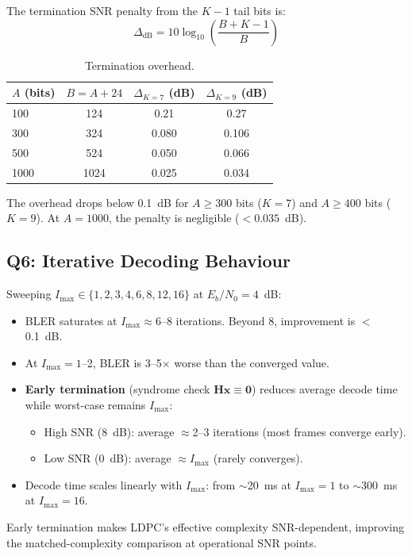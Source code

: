 \documentclass[12pt, a4paper]{article}
\begin{document}
The termination SNR penalty from the $K-1$ tail bits is:
\begin{equation}
\Delta_{\text{dB}} = 10\log_{10}\!\left(\frac{B+K-1}{B}\right)
\end{equation}

\begin{table}[H]\centering
\caption{Termination overhead.}
\begin{tabular}{lccc}
\toprule
$A$ (bits) & $B=A+24$ & $\Delta_{K=7}$ (dB) & $\Delta_{K=9}$ (dB) \\
\midrule
100 & 124 & 0.21 & 0.27 \\
300 & 324 & 0.080 & 0.106 \\
500 & 524 & 0.050 & 0.066 \\
1000 & 1024 & 0.025 & 0.034 \\
\bottomrule
\end{tabular}
\end{table}

The overhead drops below 0.1~dB for $A\geq 300$ bits ($K\!=\!7$) and $A\geq 400$ bits ($K\!=\!9$). At $A=1000$, the penalty is negligible ($<0.035$~dB).

\subsection{Q6: Iterative Decoding Behaviour}
Sweeping $I_{\max}\in\{1,2,3,4,6,8,12,16\}$ at $E_b/N_0=4$~dB:
\begin{itemize}[nosep]
\item BLER saturates at $I_{\max}\approx 6$--8 iterations. Beyond 8, improvement is $<$0.1~dB.
\item At $I_{\max}=1$--2, BLER is 3--5$\times$ worse than the converged value.
\item \textbf{Early termination} (syndrome check $\mathbf{H}\hat{\mathbf{x}}\equiv\mathbf{0}$) reduces average decode time while worst-case remains $I_{\max}$:
  \begin{itemize}[nosep]
  \item High SNR (8~dB): average $\approx$2--3 iterations (most frames converge early).
  \item Low SNR (0~dB): average $\approx I_{\max}$ (rarely converges).
  \end{itemize}
\item Decode time scales linearly with $I_{\max}$: from $\sim$20~ms at $I_{\max}=1$ to $\sim$300~ms at $I_{\max}=16$.
\end{itemize}

Early termination makes LDPC's effective complexity SNR-dependent, improving the matched-complexity comparison at operational SNR points.
\end{document}
